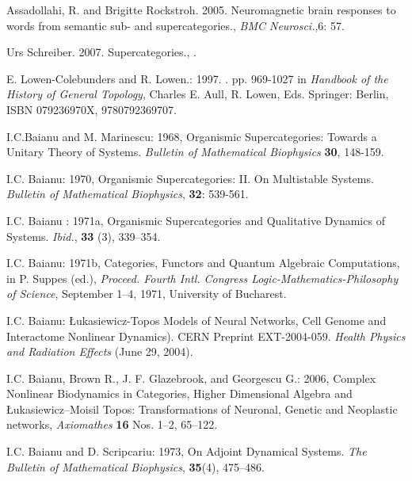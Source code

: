 \documentclass[12pt]{article}
\theoremstyle{plain}
\theoremstyle{definition}
\numberwithin{equation}{section}
\begin{document}
\begin{thebibliography}{99}

Assadollahi, R. and Brigitte Rockstroh. 2005. Neuromagnetic brain responses to words from semantic sub- and supercategories., {\em BMC Neurosci.},{6}: 57. 

Urs Schreiber. 2007. Supercategories., 
.

\bibitem{}
E. Lowen-Colebunders and R. Lowen.: 1997. 
.
 pp. 969-1027 in {\em Handbook of the History of General Topology},
Charles E. Aull, R. Lowen, Eds. Springer: Berlin, ISBN 079236970X, 9780792369707.

I.C.Baianu and M. Marinescu: 1968, Organismic Supercategories: Towards a Unitary Theory of Systems. \emph{Bulletin of Mathematical Biophysics} \textbf{30}, 148-159.

I.C. Baianu: 1970, Organismic Supercategories: II. On Multistable Systems. \emph{Bulletin of Mathematical Biophysics}, \textbf{32}: 539-561.

I.C. Baianu : 1971a, Organismic Supercategories and Qualitative Dynamics of Systems. \emph{Ibid.}, \textbf{33} (3), 339--354.

I.C. Baianu: 1971b, Categories, Functors and Quantum Algebraic Computations, in P. Suppes (ed.), \emph{Proceed. Fourth Intl. Congress Logic-Mathematics-Philosophy of Science}, September 1--4, 1971, University of Bucharest.

I.C. Baianu: \L ukasiewicz-Topos Models of Neural Networks, Cell Genome and Interactome Nonlinear Dynamics). CERN Preprint EXT-2004-059. \textit{Health Physics and Radiation Effects} (June 29, 2004). 

I.C. Baianu, Brown R., J. F. Glazebrook, and Georgescu G.: 2006, Complex Nonlinear Biodynamics in 
Categories, Higher Dimensional Algebra and \L ukasiewicz--Moisil Topos: Transformations of
Neuronal, Genetic and Neoplastic networks, \emph{Axiomathes} \textbf{16} Nos. 1--2, 65--122.

I.C. Baianu and D. Scripcariu: 1973, On Adjoint Dynamical Systems. \emph{The Bulletin of Mathematical Biophysics}, \textbf{35}(4), 475--486.


\end{thebibliography}
\end{document}
